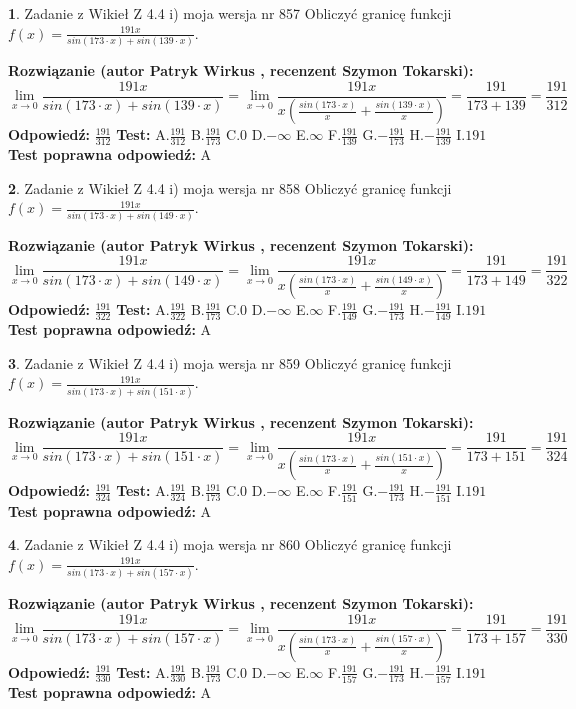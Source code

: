 \documentclass[12pt, a4paper]{article}
\theoremstyle{definition} %
\newtheorem{zad}{}
\newcommand{\zadStart}[1]{\begin{zad}#1\newline}
\newcommand{\zadStop}{\end{zad}}
\newcommand{\rozwStart}[2]{\noindent \textbf{Rozwiązanie (autor #1 , recenzent #2): }\newline}
\newcommand{\rozwStop}{\newline}
\newcommand{\odpStart}{\noindent \textbf{Odpowiedź:}\newline}
\newcommand{\odpStop}{\newline}
\newcommand{\testStart}{\noindent \textbf{Test:}\newline}
\newcommand{\testStop}{\newline}
\newcommand{\kluczStart}{\noindent \textbf{Test poprawna odpowiedź:}\newline}
\newcommand{\kluczStop}{\newline}
\begin{document}
\zadStart{Zadanie z Wikieł Z 4.4 i) moja wersja nr 857}
Obliczyć granicę funkcji $f(x)=\frac{191x}{sin(173\cdot x) +sin(139\cdot x)}$.
\zadStop
\rozwStart{Patryk Wirkus}{Szymon Tokarski}
$$\lim\limits_{x\to 0}\frac{191x}{sin(173\cdot x) +sin(139\cdot x)}=\lim\limits_{x\to 0}\frac{191x}{x(\frac{sin(173\cdot x)}{x}+\frac{sin(139\cdot x)}{x})}=\frac{191}{173+139} = \frac{191}{312}$$
\rozwStop
\odpStart
$\frac{191}{312}$
\odpStop
\testStart
A.$\frac{191}{312}$
B.$\frac{191}{173}$
C.$0$
D.$-\infty$
E.$\infty$
F.$\frac{191}{139}$
G.$-\frac{191}{173}$
H.$-\frac{191}{139}$
I.$191$
\testStop
\kluczStart
A
\kluczStop



\zadStart{Zadanie z Wikieł Z 4.4 i) moja wersja nr 858}
Obliczyć granicę funkcji $f(x)=\frac{191x}{sin(173\cdot x) +sin(149\cdot x)}$.
\zadStop
\rozwStart{Patryk Wirkus}{Szymon Tokarski}
$$\lim\limits_{x\to 0}\frac{191x}{sin(173\cdot x) +sin(149\cdot x)}=\lim\limits_{x\to 0}\frac{191x}{x(\frac{sin(173\cdot x)}{x}+\frac{sin(149\cdot x)}{x})}=\frac{191}{173+149} = \frac{191}{322}$$
\rozwStop
\odpStart
$\frac{191}{322}$
\odpStop
\testStart
A.$\frac{191}{322}$
B.$\frac{191}{173}$
C.$0$
D.$-\infty$
E.$\infty$
F.$\frac{191}{149}$
G.$-\frac{191}{173}$
H.$-\frac{191}{149}$
I.$191$
\testStop
\kluczStart
A
\kluczStop



\zadStart{Zadanie z Wikieł Z 4.4 i) moja wersja nr 859}
Obliczyć granicę funkcji $f(x)=\frac{191x}{sin(173\cdot x) +sin(151\cdot x)}$.
\zadStop
\rozwStart{Patryk Wirkus}{Szymon Tokarski}
$$\lim\limits_{x\to 0}\frac{191x}{sin(173\cdot x) +sin(151\cdot x)}=\lim\limits_{x\to 0}\frac{191x}{x(\frac{sin(173\cdot x)}{x}+\frac{sin(151\cdot x)}{x})}=\frac{191}{173+151} = \frac{191}{324}$$
\rozwStop
\odpStart
$\frac{191}{324}$
\odpStop
\testStart
A.$\frac{191}{324}$
B.$\frac{191}{173}$
C.$0$
D.$-\infty$
E.$\infty$
F.$\frac{191}{151}$
G.$-\frac{191}{173}$
H.$-\frac{191}{151}$
I.$191$
\testStop
\kluczStart
A
\kluczStop



\zadStart{Zadanie z Wikieł Z 4.4 i) moja wersja nr 860}
Obliczyć granicę funkcji $f(x)=\frac{191x}{sin(173\cdot x) +sin(157\cdot x)}$.
\zadStop
\rozwStart{Patryk Wirkus}{Szymon Tokarski}
$$\lim\limits_{x\to 0}\frac{191x}{sin(173\cdot x) +sin(157\cdot x)}=\lim\limits_{x\to 0}\frac{191x}{x(\frac{sin(173\cdot x)}{x}+\frac{sin(157\cdot x)}{x})}=\frac{191}{173+157} = \frac{191}{330}$$
\rozwStop
\odpStart
$\frac{191}{330}$
\odpStop
\testStart
A.$\frac{191}{330}$
B.$\frac{191}{173}$
C.$0$
D.$-\infty$
E.$\infty$
F.$\frac{191}{157}$
G.$-\frac{191}{173}$
H.$-\frac{191}{157}$
I.$191$
\testStop
\kluczStart
A
\kluczStop
\end{document}
